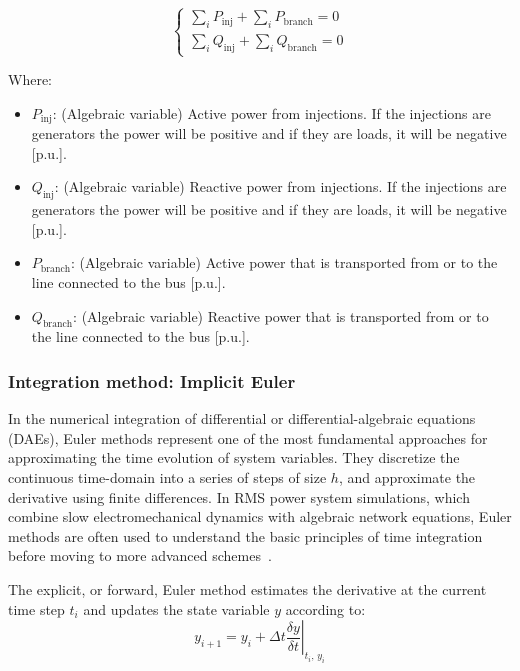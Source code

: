\begin{equation}
\begin{cases}
\sum_i P_{\text{inj}} + \sum_i P_{\text{branch}} = 0\\
\sum_i Q_{\text{inj}} + \sum_i Q_{\text{branch}} = 0
\end{cases}
\label{eq:alg_eq_bus}
\end{equation}

Where:
\begin{itemize}
  \item $P_{\text{inj}}$: (Algebraic variable) Active power from injections. If the injections are generators the power will be positive and if they are loads, it will be negative [p.u.].
  \item $Q_{\text{inj}}$: (Algebraic variable) Reactive power from injections. If the injections are generators the power will be positive and if they are loads, it will be negative [p.u.].
  \item $P_{\text{branch}}$: (Algebraic variable) Active power that is transported from or to the line connected to the bus [p.u.].
  \item $Q_{\text{branch}}$: (Algebraic variable) Reactive power that is transported from or to the line connected to the bus [p.u.].
\end{itemize}

\subsubsection{Integration method: Implicit Euler}

In the numerical integration of differential or differential-algebraic equations (DAEs), Euler methods represent one of the most fundamental approaches
for approximating the time evolution of system variables. They discretize the continuous time-domain into a series of steps of size $h$,
and approximate the derivative using finite differences. In RMS power system simulations, which combine slow electromechanical dynamics with algebraic network equations,
Euler methods are often used to understand the basic principles of time integration before moving to more advanced schemes~\cite{Butcher2008}.


The explicit, or forward, Euler method estimates the derivative at the current time step $t_i$ and updates the state variable $y$ according to:
\begin{equation}
    y_{i+1} = y_i + \Delta t \left.\frac{\delta y}{\delta t}\right|_{t_i, \, y_i}
    \label{eq:forward_euler}
\end{equation}

